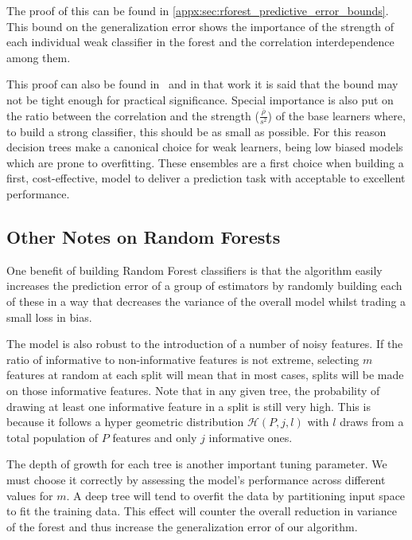The proof of this can be found in \cref{appx:sec:rforest_predictive_error_bounds}.\\

This bound on the generalization error shows the importance of the strength of each individual weak classifier in the forest and the correlation interdependence among them.

This proof can also be found in~\cite{breiman-randomforests} and in that work it is said that the bound may not be tight enough for practical significance.
Special importance is also put on the ratio between the correlation and the strength ($\frac{\overline{\rho}}{s^2}$) of the base learners where, to build a strong classifier, this should be as small as possible.
For this reason decision trees make a canonical choice for weak learners, being low biased models which are prone to overfitting.
These ensembles are a first choice when building a first, cost-effective, model to deliver a prediction task with acceptable to excellent performance.


\subsection{Other Notes on Random Forests}\label{subsection:random_forests_other_notes}

One benefit of building Random Forest classifiers is that the algorithm easily increases the prediction error of a group of estimators by randomly building each of these in a way that decreases the variance of the overall model whilst trading a small loss in bias.

The model is also robust to the introduction of a number of noisy features.
If the ratio of informative to non-informative features is not extreme, selecting $m$ features at random at each split will mean that in most cases, splits will be made on those informative features.
Note that in any given tree, the probability of drawing at least one informative feature in a split is still very high.
This is because it follows a hyper geometric distribution $\mathcal{H}(P,j,l)$ with $l$ draws from a total population of $P$ features and only $j$ informative ones.

The depth of growth for each tree is another important tuning parameter.
We must choose it correctly by assessing the model's performance across different values for $m$.
A deep tree will tend to overfit the data by partitioning input space to fit the training data.
This effect will counter the overall reduction in variance of the forest and thus increase the generalization error of our algorithm.

